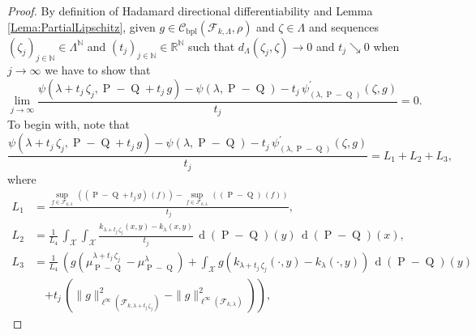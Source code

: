			\begin{proof}
				By definition of Hadamard directional differentiability and Lemma \ref{Lema:PartialLipschitz}, given $g\in\mathcal{C}_{\operatorname{bpl}}\left(\mathcal{F}_{k,\Lambda},\rho\right)$ and $\zeta\in\Lambda$ and sequences $\left(\zeta_{j}\right)_{j\in\mathbb{N}}\in\Lambda^{\mathbb{N}}$ and $\left(t_{j}\right)_{j\in\mathbb{N}}\in\mathbb{R}^{\mathbb{N}}$ such that $d_{\Lambda}\left(\zeta_{j},\zeta\right)\longrightarrow0$ and $t_{j}\searrow0$ when $j\longrightarrow\infty$ we have to show that
				\begin{equation}
					\lim_{j\longrightarrow\infty}\frac{\psi\left(\lambda+t_{j}\,\zeta_{j},\operatorname{P}-\operatorname{Q}+t_{j}\,g\right)-\psi(\lambda,\operatorname{P}-\operatorname{Q})-t_{j}\,\psi_{(\lambda,\operatorname{P}-\operatorname{Q})}^{\prime}\left(\zeta,g\right)}{t_{j}}=0.
				\end{equation}
				To begin with, note that
				\begin{equation}
					\frac{\psi\left(\lambda+t_{j}\,\zeta_{j},\operatorname{P}-\operatorname{Q}+t_{j}\,g\right)-\psi(\lambda,\operatorname{P}-\operatorname{Q})-t_{j}\,\psi_{(\lambda,\operatorname{P}-\operatorname{Q})}^{\prime}\left(\zeta,g\right)}{t_{j}}=L_{1}+L_{2}+L_{3},
				\end{equation}
				where
				\begin{equation}
					\begin{aligned}
						L_{1}&=\frac{\underset{f\in\mathcal{F}_{k,\lambda}}{\operatorname{sup}}\,\left(\left(\operatorname{P}-\operatorname{Q}+t_{j}\,g\right)\,(f)\right)-\underset{f\in\mathcal{F}_{k,\lambda}}{\operatorname{sup}}\,\left(\left(\operatorname{P}-\operatorname{Q}\right)\,(f)\right)}{t_{j}},
						\\
						L_{2}&=\frac{1}{L_{4}}\,\int_{\mathcal{X}}\int_{\mathcal{X}}\frac{k_{\lambda+t_{j}\,\zeta_{j}}(x,y)-k_{\lambda}(x,y)}{t_{j}}\,\operatorname{d}(\operatorname{P}-\operatorname{Q})(y)\,\operatorname{d}(\operatorname{P}-\operatorname{Q})(x),
						\\
						L_{3}&=\frac{1}{L_{4}}\,\left(g\left(\mu_{\operatorname{P}-\operatorname{Q}}^{\lambda+t_{j}\,\zeta_{j}}-\mu_{\operatorname{P}-\operatorname{Q}}^{\lambda}\right)+\int_{\mathcal{X}}g\left(k_{\lambda+t_{j}\,\zeta_{j}}(\cdot,y)-k_{\lambda}(\cdot,y)\right)\,\operatorname{d}(\operatorname{P}-\operatorname{Q})(y)\right.
						\\
						&\quad\left.+t_{j}\,\left(\|g\|_{\ell^{\infty}\left(\mathcal{F}_{k,\lambda+t_{j}\,\zeta_{j}}\right)}^{2}-\|g\|_{\ell^{\infty}\left(\mathcal{F}_{k,\lambda}\right)}^{2}\right)\right),

\end{aligned}
\end{equation}
\end{proof}
